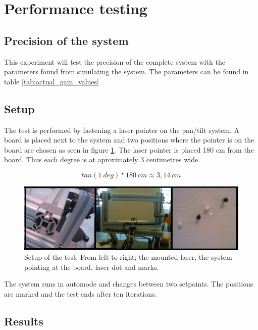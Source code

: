 \section{Performance testing}

\subsection{Precision of the system}\label{subsec:precisionofsystem}
This experiment will test the precision of the complete system with the
parameters found from simulating the system. The parameters can be found in
table \ref{tab:actual_gain_values}

\subsection*{Setup}

The test is performed by fastening a laser pointer on the pan/tilt system. A
board is placed next to the system and two positions where the pointer is on the
board are chosen as seen in figure \ref{fig:systemtestsetup}. The laser pointer is placed 180 cm
from the board. Thus each degree is at aproximately 3 centimetres wide.

\[ tan(1 \ deg) * 180 \ cm \approx 3,14 \ cm \]


\begin{figure}[htb] \centering \includegraphics[width=\textwidth,trim=0 0 0
0]{graphics/overallsystemtest.png} %
	\caption{Setup of the test. From left to right; the mounted laser, the system pointing at the board, laser dot and marks.}
	\label{fig:systemtestsetup}			%
\end{figure}

The system runs in automode and changes between two setpoints. The positions
are marked and the test ends after ten iterations. 

\subsection*{Results}

